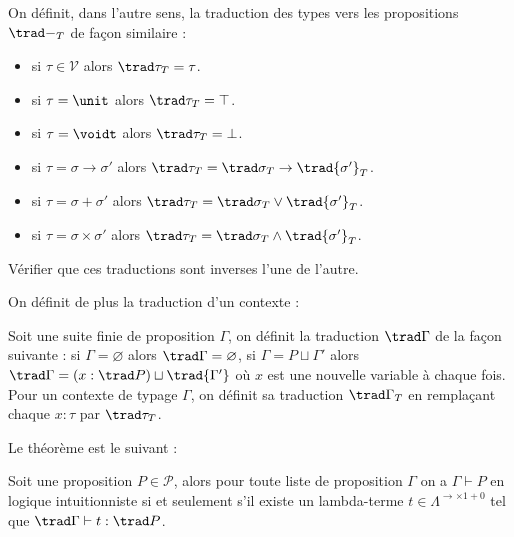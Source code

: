 \begin{defi}
    On définit, dans l'autre sens, la traduction des types vers les propositions $\trad -_T$ de façon similaire :
    \begin{itemize}[label=$\bullet$]
        \item si $\tau \in\mathcal V$ alors $\trad \tau_T = \tau$.
        \item si $\tau = \unit$ alors $\trad \tau_T = \top$.
        \item si $\tau = \voidt$ alors $\trad \tau_T = \bot$.
        \item si $\tau = \sigma \to \sigma'$ alors $\trad \tau_T = \trad \sigma_T \to \trad{\sigma'}_T$.
        \item si $\tau = \sigma + \sigma'$ alors $\trad \tau_T = \trad \sigma_T \lor \trad{\sigma'}_T$.
        \item si $\tau = \sigma \times \sigma'$ alors $\trad \tau_T = \trad \sigma_T \land \trad{\sigma'}_T$.
    \end{itemize}
\end{defi}

\begin{exo}
    Vérifier que ces traductions sont inverses l'une de l'autre.
\end{exo}

On définit de plus la traduction d'un contexte :

\begin{defi}
    Soit une suite finie de proposition $\Gamma$, on définit la traduction $\trad\Gamma$ de la façon suivante : si $\Gamma = \varnothing$ alors $\trad\Gamma = \varnothing$, si $\Gamma = P \sqcup \Gamma'$ alors $\trad \Gamma = (x : \trad P) \sqcup \trad{\Gamma'}$ où $x$ est une nouvelle variable à chaque fois. Pour un contexte de typage $\Gamma$, on définit sa traduction $\trad\Gamma_T$ en remplaçant chaque $x : \tau$ par $\trad\tau_T$.
\end{defi}

Le théorème est le suivant :

\begin{them}
    Soit une proposition $P \in\mathcal P$, alors pour toute liste de proposition $\Gamma$ on a $\Gamma\vdash P$ en logique intuitionniste si et seulement s'il existe un lambda-terme $t\in\Lambda^{\to\times 1+0}$ tel que $\trad\Gamma\vdash t : \trad P$.
\end{them}